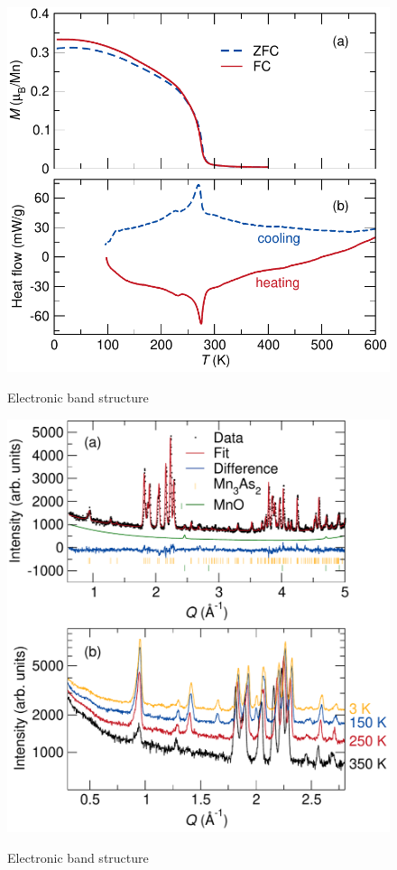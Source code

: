 \documentclass[11pt,edeposit,draftthesis]{uiucthesis2020}
\begin{document}
\begin{mainmatter}
\begin{figure}
\centering\includegraphics[width=\columnwidth]{figures/ch6/FC_ZFC_DSC_Mn3As2_cropped.pdf} \\
\caption{\label{fig:Mn3As2_FC_ZFC_DSC}
Electronic band structure
}
\end{figure}

\begin{figure}
\centering\includegraphics[width=\columnwidth]{figures/ch6/350K_rietveld_diff_temp_NPD_cropped.pdf} \\
\caption{\label{fig:350K}
Electronic band structure
}
\end{figure}


\end{mainmatter}
\end{document}

